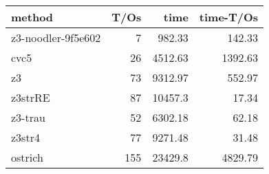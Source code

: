 \begin{tabular}{lrrr}
\hline
 method             &   T/Os &     time &   time-T/Os \\
\hline
 z3-noodler-9f5e602 &      7 &   982.33 &      142.33 \\
 cvc5               &     26 &  4512.63 &     1392.63 \\
 z3                 &     73 &  9312.97 &      552.97 \\
 z3strRE            &     87 & 10457.3  &       17.34 \\
 z3-trau            &     52 &  6302.18 &       62.18 \\
 z3str4             &     77 &  9271.48 &       31.48 \\
 ostrich            &    155 & 23429.8  &     4829.79 \\
\hline
\end{tabular}
